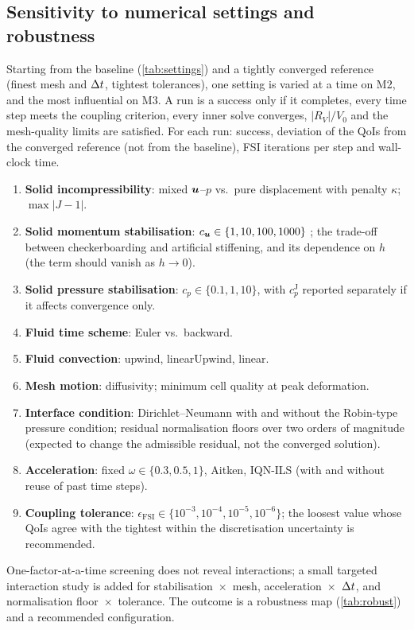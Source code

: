 \subsection{Sensitivity to numerical settings and robustness}\label{sec:ver:robust}
Starting from the baseline (\cref{tab:settings}) and a tightly converged
reference (finest mesh and $\Delta t$, tightest tolerances), one setting is
varied at a time on M2, and the most influential on M3. A run is a success
only if it completes, every time step meets the coupling criterion, every
inner solve converges, $|R_V|/V_0$ and the mesh-quality limits are
satisfied. For each run: success, deviation of the QoIs from the converged
reference (not from the baseline), FSI iterations per step and wall-clock
time.
\begin{enumerate}
\item \textbf{Solid incompressibility}: mixed $\bm{u}$--$p$ vs.\ pure
  displacement with penalty $\kappa$; $\max|J-1|$.
\item \textbf{Solid momentum stabilisation}: $c_{\bm{u}}\in\{1,10,100,1000\}$
  ; the trade-off between checkerboarding and artificial
  stiffening, and its dependence on $h$ (the term should vanish as
  $h\to0$).
\item \textbf{Solid pressure stabilisation}: $c_p\in\{0.1,1,10\}$, with
  $c_p^{\mathrm J}$ reported separately if it affects convergence only.
\item \textbf{Fluid time scheme}: Euler vs.\ backward.
\item \textbf{Fluid convection}: upwind, linearUpwind, linear.
\item \textbf{Mesh motion}: diffusivity; minimum cell quality at peak
  deformation.
\item \textbf{Interface condition}: Dirichlet--Neumann with and without
  the Robin-type pressure condition; residual normalisation floors over two
  orders of magnitude (expected to change the admissible residual, not the
  converged solution).
\item \textbf{Acceleration}: fixed $\omega\in\{0.3,0.5,1\}$, Aitken, IQN-ILS
  (with and without reuse of past time steps).
\item \textbf{Coupling tolerance}: $\epsilon_{\mathrm{FSI}}\in\{10^{-3},10^{-4},10^{-5},10^{-6}\}$;
  the loosest value whose QoIs agree with the tightest within the
  discretisation uncertainty is recommended.
\end{enumerate}
One-factor-at-a-time screening does not reveal interactions; a small
targeted interaction study is added for stabilisation~$\times$~mesh,
acceleration~$\times$~$\Delta t$, and normalisation floor~$\times$~tolerance. The
outcome is a robustness map (\cref{tab:robust}) and a recommended
configuration.


